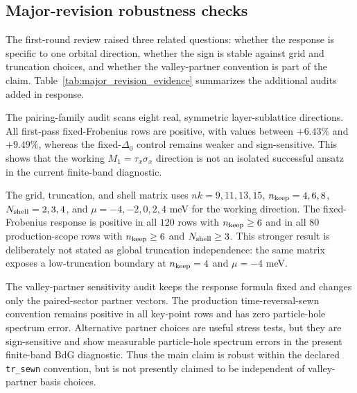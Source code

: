 \documentclass[aps,prb,reprint,superscriptaddress,floatfix,nofootinbib]{revtex4-2}
\begin{document}
\subsection{Major-revision robustness checks}

The first-round review raised three related questions: whether the response is
specific to one orbital direction, whether the sign is stable against grid and
truncation choices, and whether the valley-partner convention is part of the
claim.  Table~\ref{tab:major_revision_evidence} summarizes the additional
audits added in response.

The pairing-family audit scans eight real, symmetric layer-sublattice
directions.  All first-pass fixed-Frobenius rows are positive, with values
between $+6.43\%$ and $+9.49\%$, whereas the fixed-$\Delta_0$ control remains
weaker and sign-sensitive.  This shows that the working
$M_1=\tau_x\sigma_x$ direction is not an isolated successful ansatz in the
current finite-band diagnostic.

The grid, truncation, and shell matrix uses $nk=9,11,13,15$,
$n_{\rm keep}=4,6,8$, $N_{\rm shell}=2,3,4$, and
$\mu=-4,-2,0,2,4$ meV for the working direction.  The fixed-Frobenius response
is positive in all $120$ rows with $n_{\rm keep}\ge 6$ and in all $80$
production-scope rows with $n_{\rm keep}\ge 6$ and $N_{\rm shell}\ge 3$.
This stronger result is deliberately not stated as global truncation
independence: the same matrix exposes a low-truncation boundary at
$n_{\rm keep}=4$ and $\mu=-4$ meV.

The valley-partner sensitivity audit keeps the response formula fixed and
changes only the paired-sector partner vectors.  The production
time-reversal-sewn convention remains positive in all key-point rows and has
zero particle-hole spectrum error.  Alternative partner choices are useful
stress tests, but they are sign-sensitive and show measurable particle-hole
spectrum errors in the present finite-band BdG diagnostic.  Thus the main
claim is robust within the declared \texttt{tr\_sewn} convention, but is not
presently claimed to be independent of valley-partner basis choices.
\end{document}

